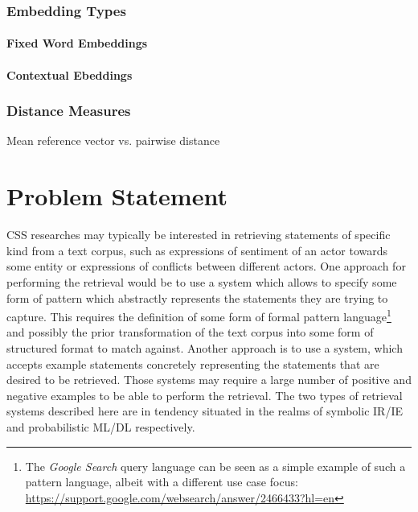 \documentclass[11pt]{scrreprt}
\begin{document}
\subsection{Embedding Types}

\subsubsection{Fixed Word Embeddings}

\subsubsection{Contextual Ebeddings}


\subsection{Distance Measures}

Mean reference vector vs. pairwise distance

\chapter{Problem Statement}
\label{cha:problem-statement}
CSS researches may typically be interested in retrieving statements of specific kind from a text corpus, such as expressions of sentiment of an actor towards some entity or expressions of conflicts between different actors. One approach for performing the retrieval would be to use a system which allows to specify some form of pattern which abstractly represents the statements they are trying to capture. This requires the definition of some form of formal pattern language\footnote{The \textit{Google Search} query language can be seen as a simple example of such a pattern language, albeit with a different use case focus: \url{https://support.google.com/websearch/answer/2466433?hl=en}} and possibly the prior transformation of the text corpus into some form of structured format to match against. Another approach is to use a system, which accepts example statements concretely representing the statements that are desired to be retrieved. Those systems may require a large number of positive and negative examples to be able to perform the retrieval. The two types of retrieval systems described here are in tendency situated in the realms of symbolic IR/IE and probabilistic ML/DL respectively.
\end{document}
